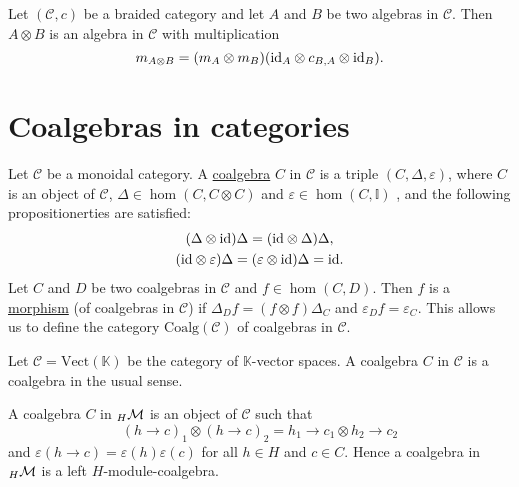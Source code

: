 
\begin{example}
Let $(\mathcal{C},c)$ be a braided category and let $A$ and $B$ be two algebras
in $\mathcal{C}$. Then $A\otimes B$ is an algebra in $\mathcal{C}$ with
multiplication 
\[
m_{A\otimes B}=(m_A\otimes m_B)(\mathrm{id}_A\otimes c_{B,A}\otimes \mathrm{id}_B).
\]
\end{example}

\section{Coalgebras in categories}

\begin{definition}
Let $\mathcal{C}$ be a monoidal category. A \underline{coalgebra}
$C$ in $\mathcal{C}$ is a triple $(C,\Delta,\varepsilon)$, where
$C$ is an object of $\mathcal{C}$, $\Delta\in\hom(C,C\otimes C)$
and $\varepsilon\in\hom(C,\mathbb{I})$ , and the following propositionerties
are satisfied: 
\begin{gather*}
(\Delta\otimes\mathrm{id})\Delta=(\mathrm{id}\otimes\Delta)\Delta,\\
(\mathrm{id}\otimes\varepsilon)\Delta=(\varepsilon\otimes\mathrm{id})\Delta=\mathrm{id}.
\end{gather*}
Let $C$ and $D$ be two coalgebras in $\mathcal{C}$ and $f\in\hom(C,D)$.
Then $f$ is a \underline{morphism} (of coalgebras in $\mathcal{C}$)
if $\Delta_{D}f=(f\otimes f)\Delta_{C}$ and $\varepsilon_{D}f=\varepsilon_{C}$.
This allows us to define the category $\mathrm{Coalg}(\mathcal{C})$
of coalgebras in $\mathcal{C}$.
\end{definition}

\begin{example}
Let $\mathcal{C}=\mathrm{Vect}(\mathbb{K})$ be the category of $\mathbb{K}$-vector
spaces. A coalgebra $C$ in $\mathcal{C}$ is a coalgebra in the usual sense.
\end{example}

\begin{example}
A coalgebra $C$ in ${}_{H}\mathcal{M}$ is an object of $\mathcal{C}$ such that 
\[
(h\to c)_{1}\otimes(h\to c)_{2}=h_{1}\to c_{1}\otimes h_{2}\to c_{2}
\]
and $\varepsilon(h\to c)=\varepsilon(h)\varepsilon(c)$ for all $h\in H$ and
$c\in C$. Hence a coalgebra in ${}_{H}\mathcal{M}$ is a left $H$-module-coalgebra.
\end{example}

